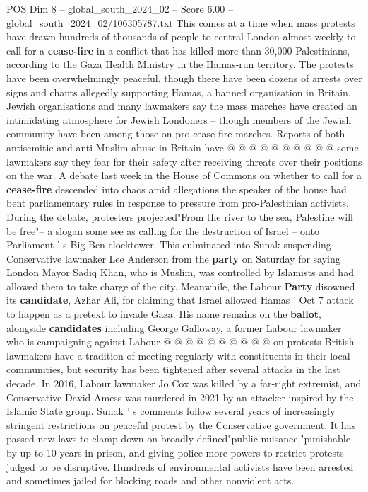 \begin{textsample}{POS Dim 8 – global\_south\_2024\_02 – Score 6.00 – global\_south\_2024\_02/106305787.txt}
This comes at a time when mass protests have drawn hundreds of thousands of people to central London almost weekly to call for a \textbf{cease-fire} in a conflict that has killed more than 30,000 Palestinians, according to the Gaza Health Ministry in the Hamas-run territory.
The protests have been overwhelmingly peaceful, though there have been dozens of arrests over signs and chants allegedly supporting Hamas, a banned organisation in Britain.
Jewish organisations and many lawmakers say the mass marches have created an intimidating atmosphere for Jewish Londoners -- though members of the Jewish community have been among those on pro-cease-fire marches.
Reports of both antisemitic and anti-Muslim abuse in Britain have @ @ @ @ @ @ @ @ @ @ some lawmakers say they fear for their safety after receiving threats over their positions on the war.
A debate last week in the House of Commons on whether to call for a \textbf{cease-fire} descended into chaos amid allegations the speaker of the house had bent parliamentary rules in response to pressure from pro-Palestinian activists.
During the debate, protesters projected"From the river to the sea, Palestine will be free"-- a slogan some see as calling for the destruction of Israel -- onto Parliament ' s Big Ben clocktower.
This culminated into Sunak suspending Conservative lawmaker Lee Anderson from the \textbf{party} on Saturday for saying London Mayor Sadiq Khan, who is Muslim, was controlled by Islamists and had allowed them to take charge of the city.
Meanwhile, the Labour \textbf{Party} disowned its \textbf{candidate}, Azhar Ali, for claiming that Israel allowed Hamas ' Oct 7 attack to happen as a pretext to invade Gaza.
His name remains on the \textbf{ballot}, alongside \textbf{candidates} including George Galloway, a former Labour lawmaker who is campaigning against Labour @ @ @ @ @ @ @ @ @ @ on protests British lawmakers have a tradition of meeting regularly with constituents in their local communities, but security has been tightened after several attacks in the last decade.
In 2016, Labour lawmaker Jo Cox was killed by a far-right extremist, and Conservative David Amess was murdered in 2021 by an attacker inspired by the Islamic State group.
Sunak ' s comments follow several years of increasingly stringent restrictions on peaceful protest by the Conservative government.
It has passed new laws to clamp down on broadly defined"public nuisance,"punishable by up to 10 years in prison, and giving police more powers to restrict protests judged to be disruptive.
Hundreds of environmental activists have been arrested and sometimes jailed for blocking roads and other nonviolent acts.

\end{textsample}
